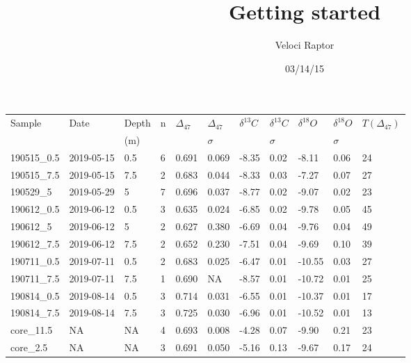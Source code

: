 \documentclass[12pt]{article}
\title{Getting started}
\author{Veloci Raptor}
\date{03/14/15}
\begin{document}
\begin{table}[]
\begin{tabular}{lllllllllll}
Sample      & Date       & Depth & n & $\Delta_{47}$   & $\Delta_{47}$ & $\delta^{13}C$  & $\delta^{13}C$ & $\delta^{18}O$   & $\delta^{18}O$ & $T(\Delta_{47})$ \\
      &        &  (m) & &  & \: $\sigma$ &   & \: $\sigma$ &   & \: $\sigma$ &  \\
\hline
190515\_0.5 & 2019-05-15 & 0.5       & 6 & 0.691 & 0.069   & -8.35 & 0.02     & -8.11  & 0.06     & 24     \\
190515\_7.5 & 2019-05-15 & 7.5       & 2 & 0.683 & 0.044   & -8.33 & 0.03     & -7.27  & 0.07     & 27     \\
190529\_5   & 2019-05-29 & 5         & 7 & 0.696 & 0.037   & -8.77 & 0.02     & -9.07  & 0.02     & 23     \\
190612\_0.5 & 2019-06-12 & 0.5       & 3 & 0.635 & 0.024   & -6.85 & 0.02     & -9.78  & 0.05     & 45     \\
190612\_5   & 2019-06-12 & 5         & 2 & 0.627 & 0.380   & -6.69 & 0.04     & -9.76  & 0.04     & 49     \\
190612\_7.5 & 2019-06-12 & 7.5       & 2 & 0.652 & 0.230   & -7.51 & 0.04     & -9.69  & 0.10      & 39     \\
190711\_0.5 & 2019-07-11 & 0.5       & 2 & 0.683 & 0.025   & -6.47 & 0.01     & -10.55 & 0.03     & 27     \\
190711\_7.5 & 2019-07-11 & 7.5       & 1 & 0.690 & NA      & -8.57 & 0.01     & -10.72 & 0.01      & 25     \\
190814\_0.5 & 2019-08-14 & 0.5       & 3 & 0.714 & 0.031   & -6.55 & 0.01     & -10.37 & 0.01     & 17     \\
190814\_7.5 & 2019-08-14 & 7.5       & 3 & 0.725 & 0.030   & -6.96 & 0.01     & -10.52 & 0.01     & 13     \\
core\_11.5  & NA         & NA        & 4 & 0.693 & 0.008   & -4.28 & 0.07     & -9.90  & 0.21     & 23     \\
core\_2.5   & NA         & NA        & 3 & 0.691 & 0.050   & -5.16 & 0.13     & -9.67  & 0.17     & 24    
\end{tabular}
\end{table}
\end{document}

